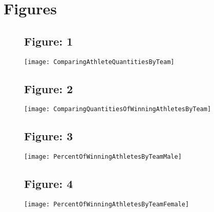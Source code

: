 \documentclass{article}
\begin{document}
\newpage
\section{Figures}
\begin{figure}[ht!]
\centering
\subsection{Figure: 1}
\centering
\texttt{[image: ComparingAthleteQuantitiesByTeam]}
\end{figure}

\begin{figure}[ht!]
\centering
\subsection{Figure: 2}
\centering
\texttt{[image: ComparingQuantitiesOfWinningAthletesByTeam]}
\end{figure}

\begin{figure}[ht!]
\centering
\subsection{Figure: 3}
\centering
\texttt{[image: PercentOfWinningAthletesByTeamMale]}
\end{figure}

\begin{figure}[ht!]
\centering
\subsection{Figure: 4}
\centering
\texttt{[image: PercentOfWinningAthletesByTeamFemale]}
\end{figure}
\end{document}
